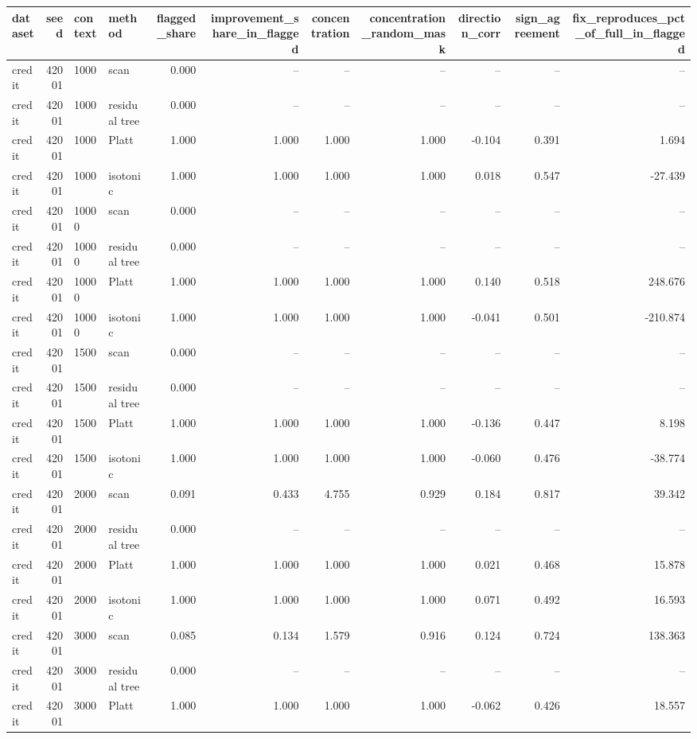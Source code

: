 \begin{tabular}{lrllrrrrrrr}
\toprule
dataset & seed & context & method & flagged_share & improvement_share_in_flagged & concentration & concentration_random_mask & direction_corr & sign_agreement & fix_reproduces_pct_of_full_in_flagged \\
\midrule
credit & 42001 & 1000 & scan & 0.000 & -- & -- & -- & -- & -- & -- \\
credit & 42001 & 1000 & residual tree & 0.000 & -- & -- & -- & -- & -- & -- \\
credit & 42001 & 1000 & Platt & 1.000 & 1.000 & 1.000 & 1.000 & -0.104 & 0.391 & 1.694 \\
credit & 42001 & 1000 & isotonic & 1.000 & 1.000 & 1.000 & 1.000 & 0.018 & 0.547 & -27.439 \\
credit & 42001 & 10000 & scan & 0.000 & -- & -- & -- & -- & -- & -- \\
credit & 42001 & 10000 & residual tree & 0.000 & -- & -- & -- & -- & -- & -- \\
credit & 42001 & 10000 & Platt & 1.000 & 1.000 & 1.000 & 1.000 & 0.140 & 0.518 & 248.676 \\
credit & 42001 & 10000 & isotonic & 1.000 & 1.000 & 1.000 & 1.000 & -0.041 & 0.501 & -210.874 \\
credit & 42001 & 1500 & scan & 0.000 & -- & -- & -- & -- & -- & -- \\
credit & 42001 & 1500 & residual tree & 0.000 & -- & -- & -- & -- & -- & -- \\
credit & 42001 & 1500 & Platt & 1.000 & 1.000 & 1.000 & 1.000 & -0.136 & 0.447 & 8.198 \\
credit & 42001 & 1500 & isotonic & 1.000 & 1.000 & 1.000 & 1.000 & -0.060 & 0.476 & -38.774 \\
credit & 42001 & 2000 & scan & 0.091 & 0.433 & 4.755 & 0.929 & 0.184 & 0.817 & 39.342 \\
credit & 42001 & 2000 & residual tree & 0.000 & -- & -- & -- & -- & -- & -- \\
credit & 42001 & 2000 & Platt & 1.000 & 1.000 & 1.000 & 1.000 & 0.021 & 0.468 & 15.878 \\
credit & 42001 & 2000 & isotonic & 1.000 & 1.000 & 1.000 & 1.000 & 0.071 & 0.492 & 16.593 \\
credit & 42001 & 3000 & scan & 0.085 & 0.134 & 1.579 & 0.916 & 0.124 & 0.724 & 138.363 \\
credit & 42001 & 3000 & residual tree & 0.000 & -- & -- & -- & -- & -- & -- \\
credit & 42001 & 3000 & Platt & 1.000 & 1.000 & 1.000 & 1.000 & -0.062 & 0.426 & 18.557 \\

\end{tabular}
